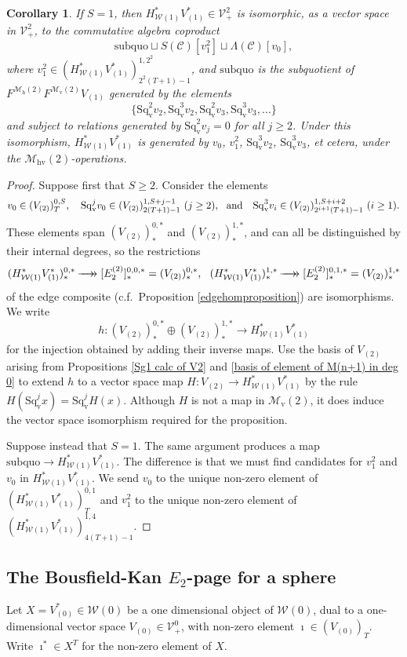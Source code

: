 \documentclass[11pt]{amsart} \renewcommand{\baselinestretch}{1.2}
\theoremstyle{plain}
\newtheorem{cor}[thm]{Corollary}
\numberwithin{equation}{section} %
\theoremstyle{plain}
\newtheorem{cor}[thm]{Corollary}
\numberwithin{equation}{chapter} %
\renewcommand{\to}{\longrightarrow}
\newcommand{\scrC}{\mathscr{C}}
\newcommand{\calV}{\mathcal{V}}
\newcommand{\calw}{\mathcal{W}}
\newcommand{\calMv}{\mathcal{M}\dver}
\newcommand{\calMh}{\mathcal{M}\dhor}
\newcommand{\calMhv}{\mathcal{M}_\mathrm{hv}}
\newcommand{\CommOperad}{{\scrC}}
\newcommand{\vect}[2]{\calV^{#1}_{#2}}
\newcommand{\epi}{{\,\makebox[0cm][l]{\ensuremath\to}\to{}}}
\newcommand{\E}[5]{[E^{#1}_{#2}#3]^{#4}_{#5}}
\newcommand{\dver}{_\mathrm{v}}
\newcommand{\dhor}{_\mathrm{h}}
\newcommand{\Sqv}{\mathrm{Sq}\dver}
\newcommand{\SubsectionOrSection}[1]{\subsection{#1}}
\begin{document}
\begin{Calculations of HWn}
\begin{cor}
If $S=1$, then $H^*_{\calw(1)}V^*_{(1)}\in \vect{2}{+}$ is isomorphic, as a vector space in $\vect{2}{+}$, to the commutative algebra coproduct
\[\mathrm{subquo}\sqcup S(\CommOperad) [v_1^{2}]\sqcup \Lambda(\CommOperad)[v_0],\] where $v_1^2\in(H^*_{\calw(1)}V^*_{(1)})^{1,2^2}_{2^2(T+1)-1}$, and $\mathrm{subquo}$ is the subquotient of $F^{\calMh(2)}F^{\calMv(2)}V_{(1)}$ generated by the elements
\[\{\Sqv^2v_{2},\Sqv^3v_{2},\Sqv^2v_{3},\Sqv^3v_{3},\ldots\}\]
and subject to relations generated by 
$\Sqv^2 v_{j}=0$ for all $j\geq2$. Under this isomorphism, $H^*_{\calw(1)}V^*_{(1)}$ is generated by $v_0$, $ v_1^2$, $\Sqv^3 v_2$, $\Sqv^3 v_3$, et cetera, under the $\calMhv(2)$-operations.
\end{cor}
\begin{proof}
Suppose first that $S\geq2$. Consider the elements
\[v_0\in (V_{(2)})^{0,S}_{T},\ \ \ \Sqv^j v_0\in (V_{(2)})^{1,S+j-1}_{2(T+1)-1}\  \textup{($j\geq2$)},\ \ \textup{and}\ \ \ \Sqv^3v_i\in (V_{(2)})^{1,S+i+2}_{2^{i+1}(T+1)-1}\ \textup{($i\geq1$)}.\]
These elements span $(V_{(2)})^{0,*}_*$ and $(V_{(2)})^{1,*}_*$, and can all be distinguished by their internal degrees, so the restrictions 
\[(H^*_{\calw(1)}V^*_{(1)})^{0,*}_*\epi \E{(2)}{2}{}{0,0,*}{*}=(V_{(2)})^{0,*}_*,\ \ (H^*_{\calw(1)}V^*_{(1)})^{1,*}_*\epi \E{(2)}{2}{}{0,1,*}{*}=(V_{(2)})^{1,*}_*\]
 of the edge composite (c.f.\ Proposition \ref{edgehomproposition}) are isomorphisms. We write
\[h:(V_{(2)})^{0,*}_*\oplus (V_{(2)})^{1,*}_*\to H^*_{\calw(1)}V^*_{(1)}\]
for the injection obtained by adding their inverse maps. Use the basis of $V_{(2)}$ arising from Propositions \ref{Sg1 calc of V2} and \ref{basis of element of M(n+1) in deg 0} to extend $h$ to a vector space map $H:V_{(2)}\to H^*_{\calw(1)}V^*_{(1)}$ by the rule $H(\Sqv^jx)=\Sqv^j H(x)$. Although $H$ is not a map in $\calMv(2)$, it does induce the vector space isomorphism required for the proposition.

Suppose instead that $S=1$. The same argument produces a map $\mathrm{subquo}\to H^*_{\calw(1)}V^*_{(1)}$. The difference is that we must find candidates for $v_1^2$ and $v_0$ in $H^*_{\calw(1)}V^*_{(1)}$. We send $v_0$ to the unique non-zero element of $(H^*_{\calw(1)}V^*_{(1)})^{0,1}_{T}$ and $v_1^{2}$ to the unique non-zero element of $(H^*_{\calw(1)}V^*_{(1)})^{1,4}_{4(T+1)-1}$.
\end{proof}






\SubsectionOrSection{The Bousfield-Kan $E_2$-page for a sphere}
\label{Calculations of HW0}
Let $X=V^*_{(0)}\in\calw(0)$ be a one dimensional object of $\calw(0)$, dual to a one-dimensional vector space $V_{(0)}\in\vect{0}{+}$, with non-zero element $\imath\in(V_{(0)})_T$. Write $\imath^*\in X^T$ for the non-zero element of $X$.


\end{Calculations of HWn}
\end{document}
